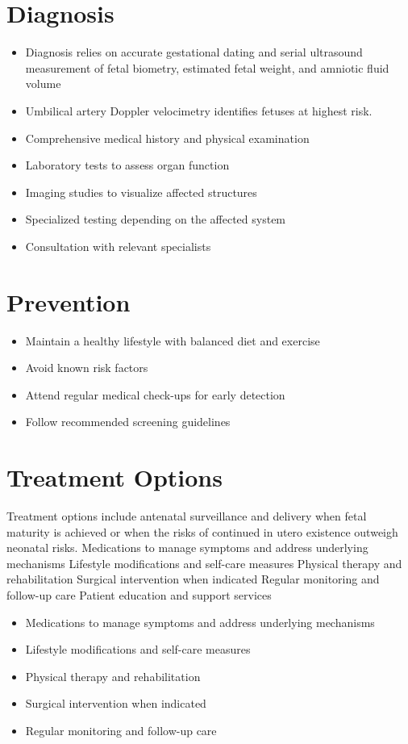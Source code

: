 \section{Diagnosis}
\begin{itemize}[noitemsep]
  \item Diagnosis relies on accurate gestational dating and serial ultrasound measurement of fetal biometry, estimated fetal weight, and amniotic fluid volume
  \item Umbilical artery Doppler velocimetry identifies fetuses at highest risk.
  \item Comprehensive medical history and physical examination
  \item Laboratory tests to assess organ function
  \item Imaging studies to visualize affected structures
  \item Specialized testing depending on the affected system
  \item Consultation with relevant specialists
\end{itemize}
\section{Prevention}
\begin{itemize}[noitemsep]
  \item Maintain a healthy lifestyle with balanced diet and exercise
  \item Avoid known risk factors
  \item Attend regular medical check-ups for early detection
  \item Follow recommended screening guidelines
\end{itemize}
\section{Treatment Options}
Treatment options include antenatal surveillance and delivery when fetal maturity is achieved or when the risks of continued in utero existence outweigh neonatal risks. Medications to manage symptoms and address underlying mechanisms Lifestyle modifications and self-care measures Physical therapy and rehabilitation Surgical intervention when indicated Regular monitoring and follow-up care Patient education and support services

\begin{itemize}[noitemsep]
  \item Medications to manage symptoms and address underlying mechanisms
  \item Lifestyle modifications and self-care measures
  \item Physical therapy and rehabilitation
  \item Surgical intervention when indicated
  \item Regular monitoring and follow-up care
\end{itemize}
